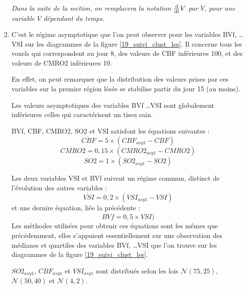 \begin{enumerate}[label=\textbf{(L\'esion 1 - \arabic*)}]
\par
\emph{Dans la suite de la section, on remplacera la notation $\frac{\text{d}}{\text{d}t}V$ par $\dot{V}$, pour une variable $V$ d\'ependant du temps.}
\item C'est le r\'egime asymptotique que l'on peut observer pour les variables BVf, \dots VSI sur les diagrammes de la figure \ref{19_suivi_clust_les}. %
Il concerne tous les voxels qui correspondent au jour 8,  des valeurs de CBF inf\'erieures  100, et des valeurs de CMRO2 inf\'erieures  10.

\par
En effet, on peut remarquer que la distribution des valeurs prises par ces variables sur la premire r\'egion l\'es\'ee se stabilise  partir du jour 15 (au moins).

\par
Les valeurs asymptotiques des variables BVf \dots VSI sont globalement inf\'erieures  celles qui caract\'erisent un tissu sain.

\par
BVf, CBF, CMRO2, SO2 et VSI satisfont les \'equations suivantes :
\begin{equation}
\dot{CBF}=5\times\left(CBF_{asy1}-CBF\right)
\end{equation}
\begin{equation}
\dot{CMRO2}=0,15\times\left(CMRO2_{asy1}-CMRO2\right)
\end{equation}
\begin{equation}
\dot{SO2}=1\times\left(SO2_{asy1}-SO2\right)
\end{equation}

Les deux variables VSI et BVf suivent un r\'egime commun, distinct de l'\'evolution des autres variables :
\begin{equation}
\dot{VSI}=0,2\times (VSI_{asy1}-VSI)
\end{equation}
et une dernire \'equation, li\'ee  la pr\'ec\'edente :
\begin{equation}
\dot{BVf}=0,5\times\dot{VSI})
\end{equation}
Les m\'ethodes utilis\'ees pour obtenir ces \'equations sont les m\^emes que pr\'ec\'edemment, %
elles s'appuient essentiellement sur une observation des m\'edianes et quartiles des variables BVf, %
\dots VSI que l'on trouve sur les diagrammes de la figure \ref{19_suivi_clust_les}.

\par
$SO2_{asy1}$, $CBF_{asy1}$ et $VSI_{asy1}$ sont distribu\'es selon les lois $\mathcal{N}(75,25)$, $\mathcal{N}(50,40)$ et $\mathcal{N}(4,2)$.
\end{enumerate}

